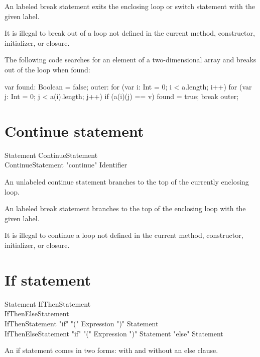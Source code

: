 An labeled break statement exits the enclosing loop
or switch statement with the given label.

It is illegal to break out of a loop not defined in the current
method, constructor, initializer, or closure.

The following code searches for an element of a two-dimensional
array and breaks out of the loop when found:

\begin{xten}
var found: Boolean = false;
outer: for (var i: Int = 0; i < a.length; i++)
    for (var j: Int = 0; j < a(i).length; j++)
        if (a(i)(j) == v) {
            found = true;
            break outer;
        }
\end{xten}

\section{Continue statement}

\begin{grammar}
Statement \: ContinueStatement \\
ContinueStatement \: \xcd"continue" Identifier\opt \\
\end{grammar}

An unlabeled continue statement branches to the top of the
currently enclosing loop.

An labeled break statement branches to the top of the enclosing loop
with the given label.

It is illegal to continue a loop not defined in the current
method, constructor, initializer, or closure.

\section{If statement}

\begin{grammar}
Statement \: IfThenStatement \\
          \| IfThenElseStatement \\
IfThenStatement \: \xcd"if" \xcd"(" Expression \xcd")" Statement \\
IfThenElseStatement \: \xcd"if" \xcd"(" Expression \xcd")" Statement \xcd"else" Statement \\
\end{grammar}

An if statement comes in two forms: with and without an else
clause.

